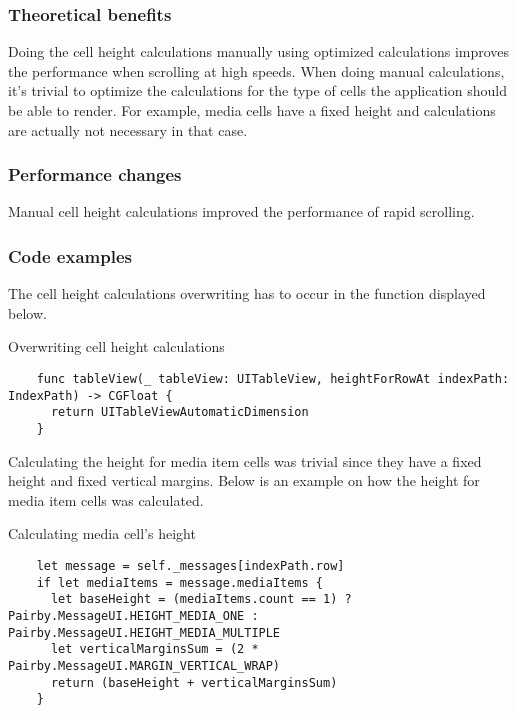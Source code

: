 \documentclass[a4paper,12pt]{article}
\begin{document}
\subsubsection*{Theoretical benefits}
Doing the cell height calculations manually using optimized calculations improves the performance when scrolling at high speeds. When doing manual calculations, it's trivial to optimize the calculations for the type of cells the application should be able to render. For example, media cells have a fixed height and calculations are actually not necessary in that case.

\subsubsection*{Performance changes}
Manual cell height calculations improved the performance of rapid scrolling.


\subsubsection*{Code examples}
The cell height calculations overwriting has to occur in the function displayed below.
\begin{listing}[H]
  \caption{Overwriting cell height calculations}
  \begin{verbatim}
    func tableView(_ tableView: UITableView, heightForRowAt indexPath: IndexPath) -> CGFloat {
      return UITableViewAutomaticDimension
    }
  \end{verbatim}
\end{listing}

Calculating the height for media item cells was trivial since they have a fixed height and fixed vertical margins. Below is an example on how the height for media item cells was calculated.
\begin{listing}[H]
  \caption{Calculating media cell's height}
  \begin{verbatim}
    let message = self._messages[indexPath.row]
    if let mediaItems = message.mediaItems {
      let baseHeight = (mediaItems.count == 1) ? Pairby.MessageUI.HEIGHT_MEDIA_ONE : Pairby.MessageUI.HEIGHT_MEDIA_MULTIPLE
      let verticalMarginsSum = (2 * Pairby.MessageUI.MARGIN_VERTICAL_WRAP)
      return (baseHeight + verticalMarginsSum)
    }
  \end{verbatim}
\end{listing}
\end{document}
